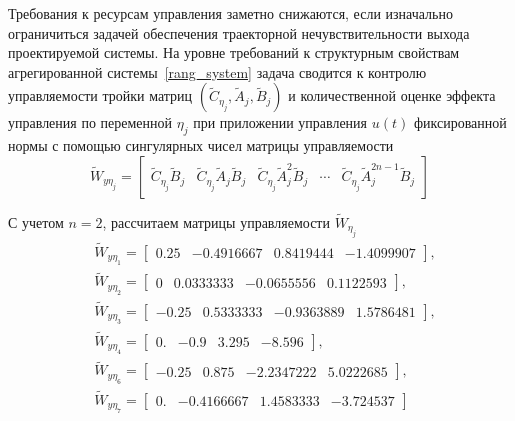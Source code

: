 Требования к ресурсам управления заметно снижаются, если изначально ограничиться задачей обеспечения траекторной нечувствительности выхода проектируемой системы. На уровне требований к структурным свойствам агрегированной системы~\ref{rang_system} задача сводится к контролю управляемости тройки матриц $(\tilde{C}_{\eta_j}, \tilde{A}_{j}, \tilde{B}_{j})$ и количественной оценке эффекта управления по переменной $\eta_j$ при приложении управления $u(t)$ фиксированной нормы с помощью сингулярных чисел матрицы управляемости
\begin{equation}
	\tilde{W}_{y \eta_j} =
	\begin{bmatrix}
		\tilde{C}_{\eta_j} \tilde{B}_{j} &
		\tilde{C}_{\eta_j} \tilde{A}_{j} \tilde{B}_{j} &
		\tilde{C}_{\eta_j} \tilde{A}_{j}^2 \tilde{B}_{j} &		
		\cdots &
		\tilde{C}_{\eta_j} \tilde{A}_{j}^{2n-1} \tilde{B}_{j}
	\end{bmatrix}
\end{equation}

С учетом $n = 2$, рассчитаем матрицы управляемости $\tilde{W}_{\eta_j}$
\begin{align*}
	&\tilde{W}_{y \eta_{1}} =
	\begin{bmatrix}
		0.25 & - 0.4916667 &   0.8419444&  - 1.4099907
	\end{bmatrix}, 
	\\
	&\tilde{W}_{y \eta_2} =
	\begin{bmatrix}
		0   &   0.0333333 & - 0.0655556  &  0.1122593  
	\end{bmatrix}, 
	\\
	&\tilde{W}_{y \eta_3} =
	\begin{bmatrix}
		- 0.25 &   0.5333333&  - 0.9363889  &  1.5786481  
	\end{bmatrix}, 
	\\
	&\tilde{W}_{y \eta_4} =
	\begin{bmatrix}
		0.&    - 0.9    &      3.295  &    - 8.596      
	\end{bmatrix}, 
	\\
	&\tilde{W}_{y \eta_6} =
	\begin{bmatrix}
		- 0.25  &  0.875   &   - 2.2347222  &  5.0222685  
	\end{bmatrix}, 
	\\
	&\tilde{W}_{y \eta_7} =
	\begin{bmatrix}
		0.  &  - 0.4166667 &   1.4583333 & - 3.724537  
	\end{bmatrix}
\end{align*}

